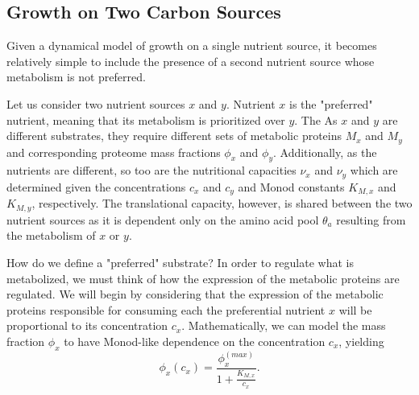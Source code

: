\documentclass[letterpaper, 11pt]{article}
\begin{document}
\begin{figure}
\end{figure}
\subsection{Growth on Two Carbon Sources}
Given a dynamical model of growth on a single nutrient source, it becomes
relatively simple to include the presence of a second nutrient source whose 
metabolism is not preferred. 

Let us consider two nutrient sources $x$ and $y$. Nutrient $x$ is the
"preferred" nutrient, meaning that its metabolism is prioritized over $y$.
The As $x$ and $y$ are different substrates, they require different sets of
metabolic proteins $M_x$ and $M_y$ and corresponding proteome mass fractions
$\phi_x$ and $\phi_y$. Additionally, as the nutrients are different, so too
are the nutritional capacities $\nu_x$ and $\nu_y$ which are determined given
the concentrations $c_x$ and $c_y$ and Monod constants $K_{M,x}$ and
$K_{M,y}$, respectively. The translational capacity, however, is shared
between the two nutrient sources as it is dependent only on the amino acid
pool $\theta_a$ resulting from the metabolism of $x$ or $y$.

How do we define a "preferred" substrate? In order to regulate what is
metabolized, we must think of how the expression of the metabolic proteins are
regulated. We will begin by considering that the expression of the metabolic
proteins responsible for consuming each the preferential nutrient $x$ will be 
proportional to its concentration $c_x$. Mathematically, we can model the mass
fraction $\phi_x$ to have Monod-like dependence on the concentration $c_x$,
yielding 
\begin{equation}
\phi_x(c_x) = \frac{\phi_x^{(max)}}{1 + \frac{K_{M, x}}{c_x}}. 
\label{eq:phix_monod}
\end{equation}
\end{document}
